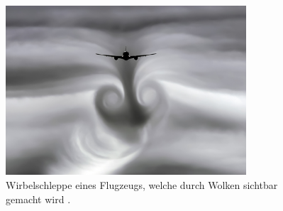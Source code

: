 \begin{figure}
\centering
\includegraphics[width=0.8\textwidth]{papers/wirbelringe/fig/wirbelschleppe_in_wolken.jpeg}
\caption{Wirbelschleppe eines Flugzeugs, welche durch Wolken sichtbar gemacht wird \cite{Wirbelringe:Wirbelschleppe_in_Wolken}. \label{Wirbelringe:fig:Wirbelschleppe_in_wolken}}
\end{figure}